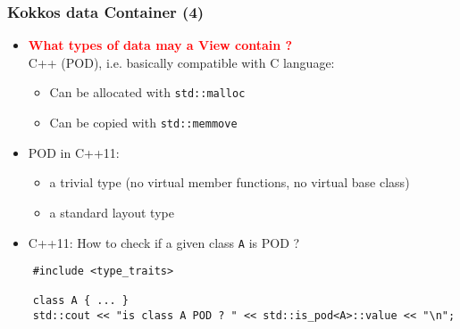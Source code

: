 \begin{frame}[fragile=singleslide]
  \frametitle{Kokkos data Container (4)}

  \begin{itemize}
  \item \textcolor{red}{\textbf{What types of data may a View contain ?}}\\
    C++  (POD), i.e. basically compatible with C language:
    \begin{itemize}
    \item Can be allocated with \texttt{std::malloc}
    \item Can be copied with \texttt{std::memmove}
    \end{itemize}
  \item POD in C++11: 
    \begin{itemize}
    \item a trivial type (no virtual member functions, no virtual base class)
    \item a standard layout type
    \end{itemize}
  \item C++11: How to check if a given class \texttt{A} is POD ?
  \end{itemize}
  \begin{verbatim}
    #include <type_traits>
    
    class A { ... }
    std::cout << "is class A POD ? " << std::is_pod<A>::value << "\n";
  \end{verbatim}
  
\end{frame}
